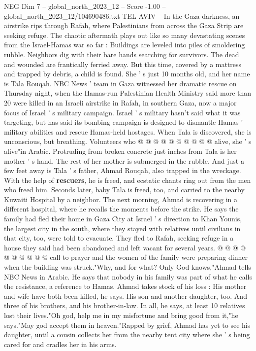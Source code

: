 \begin{textsample}{NEG Dim 7 – global\_north\_2023\_12 – Score -1.00 – global\_north\_2023\_12/104690486.txt}  \label{ex:f7_neg_309}
TEL AVIV -- In the Gaza darkness, an airstrike rips through Rafah, where Palestinians from across the Gaza Strip are seeking refuge.
The chaotic aftermath plays out like so many devastating scenes from the Israel-Hamas war so far : Buildings are leveled into piles of smoldering rubble.
Neighbors dig with their bare hands searching for survivors.
The dead and wounded are frantically ferried away.
But this time, covered by a mattress and trapped by debris, a child is found.
She ' s just 10 months old, and her name is Tala Rouqah.
NBC News ' team in Gaza witnessed her dramatic rescue on Thursday night, when the Hamas-run Palestinian Health Ministry said more than 20 were killed in an Israeli airstrike in Rafah, in southern Gaza, now a major focus of Israel ' s military campaign.
Israel ' s military hasn't said what it was targeting, but has said its bombing campaign is designed to dismantle Hamas ' military abilities and rescue Hamas-held hostages.
When Tala is discovered, she is unconscious, but breathing.
Volunteers who @ @ @ @ @ @ @ @ @ @ alive, she ' s alive"in Arabic.
Protruding from broken concrete just inches from Tala is her mother ' s hand.
The rest of her mother is submerged in the rubble.
And just a few feet away is Tala ' s father, Ahmad Rouqah, also trapped in the wreckage.
With the help of \textbf{rescuers}, he is freed, and ecstatic chants ring out from the men who freed him.
Seconds later, baby Tala is freed, too, and carried to the nearby Kuwaiti Hospital by a neighbor.
The next morning, Ahmad is recovering in a different hospital, where he recalls the moments before the strike.
He says the family had fled their home in Gaza City at Israel ' s direction to Khan Younis, the largest city in the south, where they stayed with relatives until civilians in that city, too, were told to evacuate.
They fled to Rafah, seeking refuge in a house they said had been abandoned and left vacant for several years. @ @ @ @ @ @ @ @ @ @ call to prayer and the women of the family were preparing dinner when the building was struck."Why, and for what?
Only God knows,"Ahmad tells NBC News in Arabic.
He says that nobody in his family was part of what he calls the resistance, a reference to Hamas.
Ahmad takes stock of his loss : His mother and wife have both been killed, he says.
His son and another daughter, too.
And three of his brothers, and his brother-in-law.
In all, he says, at least 10 relatives lost their lives."Oh god, help me in my misfortune and bring good from it,"he says."May god accept them in heaven."Rapped by grief, Ahmad has yet to see his daughter, until a cousin collects her from the nearby tent city where she ' s being cared for and cradles her in his arms.

\end{textsample}
